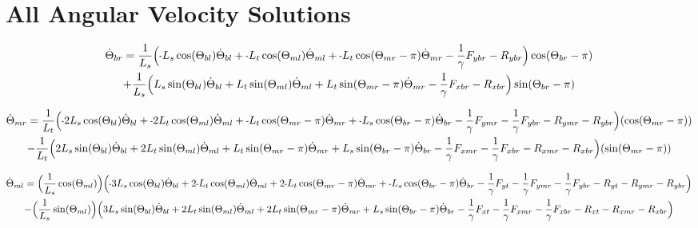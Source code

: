 \documentclass[11pt, landscape]{article}
\newcommand{\mn}{\scalebox{0.7}[1.0]{-}}
\begin{document}
\clearpage

\section{All Angular Velocity Solutions}

\begin{multline}
\dot{\Theta}_{br} =
\frac{1}{L_{s}}\Big(\mn L_{s}\cos(\Theta_{bl})\dot{\Theta}_{bl} + \mn L_{t}\cos(\Theta_{ml})\dot{\Theta}_{ml} + \mn L_{t}\cos(\Theta_{mr}-\pi)\dot{\Theta}_{mr} - \frac{1}{\gamma}F_{ybr} - R_{ybr} \Big)\cos(\Theta_{br}-\pi) \\
+ \frac{1}{L_{s}}\Big(L_{s}\sin(\Theta_{bl})\dot{\Theta}_{bl} + L_{t}\sin(\Theta_{ml})\dot{\Theta}_{ml} + L_{t}\sin(\Theta_{mr}-\pi)\dot{\Theta}_{mr} - \frac{1}{\gamma}F_{xbr} - R_{xbr} \Big)\sin(\Theta_{br}-\pi)
\end{multline}

\begin{multline}
\dot{\Theta}_{mr} =
\frac{1}{L_{t}} \Big(\mn 2L_{s}\cos(\Theta_{bl})\dot{\Theta}_{bl} + \mn 2L_{t}\cos(\Theta_{ml})\dot{\Theta}_{ml} + \mn L_{t}\cos(\Theta_{mr}-\pi)\dot{\Theta}_{mr} + \mn L_{s}\cos(\Theta_{br}-\pi)\dot{\Theta}_{br}
  - \frac{1}{\gamma}F_{ymr} - \frac{1}{\gamma}F_{ybr} - R_{ymr} - R_{ybr} \Big)(\cos(\Theta_{mr}-\pi))\\
  - \frac{1}{L_{t}}\Big(2L_{s}\sin(\Theta_{bl})\dot{\Theta}_{bl} + 2L_{t}\sin(\Theta_{ml})\dot{\Theta}_{ml} + L_{t}\sin(\Theta_{mr}-\pi)\dot{\Theta}_{mr} + L_{s}\sin(\Theta_{br}-\pi)\dot{\Theta}_{br}
   - \frac{1}{\gamma}F_{xmr} - \frac{1}{\gamma}F_{xbr} - R_{xmr} - R_{xbr} \Big)(\sin(\Theta_{mr}-\pi))
\end{multline}

\begin{multline}
\dot{\Theta}_{ml} =
\Big(\frac{1}{L_s}\cos(\Theta_{ml})\Big) \Big(\mn3L_{s}\cos(\Theta_{bl})\dot{\Theta}_{bl} + 2\mn L_{t}\cos(\Theta_{ml})\dot{\Theta}_{ml} + 2\mn L_{t}\cos(\Theta_{mr}-\pi)\dot{\Theta}_{mr} + \mn L_{s}\cos(\Theta_{br}-\pi)\dot{\Theta}_{br}
- \frac{1}{\gamma}F_{yt } - \frac{1}{\gamma}F_{ymr} - \frac{1}{\gamma}F_{ybr} - R_{yt} - R_{ymr} - R_{ybr} \Big) \\
- \Big(\frac{1}{L_s}\sin(\Theta_{ml})\Big)\Big(3L_{s}\sin(\Theta_{bl})\dot{\Theta}_{bl} + 2L_{t}\sin(\Theta_{ml})\dot{\Theta}_{ml} + 2L_{t}\sin(\Theta_{mr}-\pi)\dot{\Theta}_{mr} + L_{s}\sin(\Theta_{br}-\pi)\dot{\Theta}_{br}
- \frac{1}{\gamma}F_{xt } - \frac{1}{\gamma}F_{xmr} - \frac{1}{\gamma}F_{xbr} - R_{xt } - R_{xmr} - R_{xbr} \Big)
\end{multline}
\end{document}
